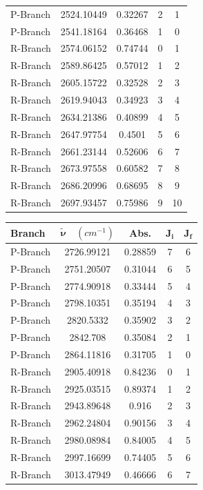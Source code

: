 \documentclass[titlepage]{article}
\begin{document}
\begin{figure}[htbp]
\begin{minipage}[t]{0.48\textwidth}
\begin{tabular}{|l|c|c|c|c|}
        P-Branch & 2524.10449 & 0.32267 & 2 & 1 \\ 
        P-Branch & 2541.18164 & 0.36468 & 1 & 0 \\ 
        \hhline{|=====|}
        R-Branch & 2574.06152 & 0.74744 & 0 & 1 \\ 
        R-Branch & 2589.86425 & 0.57012 & 1 & 2 \\ 
        R-Branch & 2605.15722 & 0.32528 & 2 & 3 \\ 
        R-Branch & 2619.94043 & 0.34923 & 3 & 4 \\ 
        R-Branch & 2634.21386 & 0.40899 & 4 & 5 \\ 
        R-Branch & 2647.97754 & 0.4501 & 5 & 6 \\ 
        R-Branch & 2661.23144 & 0.52606 & 6 & 7 \\ 
        R-Branch & 2673.97558 & 0.60582 & 7 & 8 \\ 
        R-Branch & 2686.20996 & 0.68695 & 8 & 9 \\ 
        R-Branch & 2697.93457 & 0.75986 & 9 & 10 \\ \hline
        \end{tabular}
        \label{tab:hbr}
    \end{minipage}
    \hfill
    \begin{minipage}[t]{0.48\textwidth}
        \centering
        \begin{tabular}{|l|c|c|c|c|}
        \hline
        \textbf{Branch} & \(\mathbf{\tilde{\nu}} \quad \left(cm^{-1}\right)\) 
        & \textbf{Abs.} & \(\mathbf{J_i}\) & \(\mathbf{J_f}\) \\ \hline
        P-Branch & 2726.99121 & 0.28859 & 7 & 6 \\ 
        P-Branch & 2751.20507 & 0.31044 & 6 & 5 \\ 
        P-Branch & 2774.90918 & 0.33444 & 5 & 4 \\ 
        P-Branch & 2798.10351 & 0.35194 & 4 & 3 \\ 
        P-Branch & 2820.5332 & 0.35902 & 3 & 2 \\ 
        P-Branch & 2842.708 & 0.35084 & 2 & 1 \\ 
        P-Branch & 2864.11816 & 0.31705 & 1 & 0 \\ 
        \hhline{|=====|}
        R-Branch & 2905.40918 & 0.84236 & 0 & 1 \\ 
        R-Branch & 2925.03515 & 0.89374 & 1 & 2 \\ 
        R-Branch & 2943.89648 & 0.916 & 2 & 3 \\ 
        R-Branch & 2962.24804 & 0.90156 & 3 & 4 \\ 
        R-Branch & 2980.08984 & 0.84005 & 4 & 5 \\ 
        R-Branch & 2997.16699 & 0.74405 & 5 & 6 \\ 
        R-Branch & 3013.47949 & 0.46666 & 6 & 7 \\ \hline
        \end{tabular}
        \label{tab:hcl}
    \end{minipage}
\end{figure}
\end{document}
